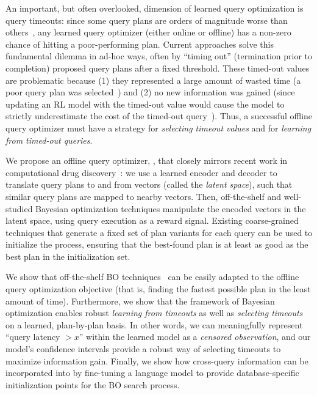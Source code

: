  An important, but often overlooked, dimension of learned query optimization is query timeouts: since some query plans are orders of magnitude worse than others~\cite{howgood}, any learned query optimizer (either online or offline) has a non-zero chance of hitting a poor-performing plan. Current approaches solve this fundamental dilemma in ad-hoc ways, often by ``timing out'' (termination prior to completion) proposed query plans after a fixed threshold. These timed-out values are problematic because (1) they represented a large amount of wasted time (a poor query plan was selected~\cite{balsa}) and (2) no new information was gained (since updating an RL model with the timed-out value would cause the model to strictly underestimate the cost of the timed-out query~\cite{neo}). Thus, a successful offline query optimizer must have a strategy for \emph{selecting timeout values} and for \emph{learning from timed-out queries}.


 We propose an offline query optimizer, \sysname, that closely mirrors recent work in computational drug discovery~\cite{lolbo}: we use a learned encoder and decoder to translate query plans to and from vectors (called the \emph{latent space}), such that similar query plans are mapped to nearby vectors. Then, off-the-shelf and well-studied Bayesian optimization techniques manipulate the encoded vectors in the latent space, using query execution as a reward signal. Existing coarse-grained techniques that generate a fixed set of plan variants for each query can be used to initialize the process, ensuring that the best-found plan is at least as good as the best plan in the initialization set.  

We show that off-the-shelf BO techniques~\cite{bayes_survey} can be easily adapted to the offline query optimization objective (that is, finding the fastest possible plan in the least amount of time). Furthermore, we show that the framework of Bayesian optimization enables robust \emph{learning from timeouts} as well as \emph{selecting timeouts} on a learned, plan-by-plan basis. In other words, we can meaningfully represent ``query latency $> x$'' within the learned model as a \emph{censored observation}, and our model's confidence intervals provide a robust way of selecting timeouts to maximize information gain. Finally, we show how cross-query information can be incorporated into \sysname by fine-tuning a language model to provide database-specific initialization points for the BO search process.


